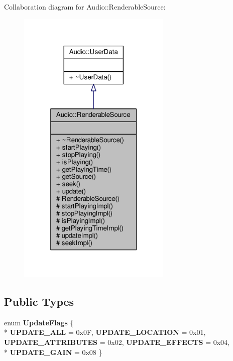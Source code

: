 Collaboration diagram for Audio\+:\+:Renderable\+Source\+:
\nopagebreak
\begin{figure}[H]
\begin{center}
\leavevmode
\includegraphics[width=208pt]{d4/d63/classAudio_1_1RenderableSource__coll__graph}
\end{center}
\end{figure}
\subsection*{Public Types}
\begin{DoxyCompactItemize}
\item 
enum {\bfseries Update\+Flags} \{ \\*
{\bfseries U\+P\+D\+A\+T\+E\+\_\+\+A\+LL} = 0x0F, 
{\bfseries U\+P\+D\+A\+T\+E\+\_\+\+L\+O\+C\+A\+T\+I\+ON} = 0x01, 
{\bfseries U\+P\+D\+A\+T\+E\+\_\+\+A\+T\+T\+R\+I\+B\+U\+T\+ES} = 0x02, 
{\bfseries U\+P\+D\+A\+T\+E\+\_\+\+E\+F\+F\+E\+C\+TS} = 0x04, 
\\*
{\bfseries U\+P\+D\+A\+T\+E\+\_\+\+G\+A\+IN} = 0x08
 \}\hypertarget{classAudio_1_1RenderableSource_a7d694db411ff2640520aa3aa56b0f4d5}{}\label{classAudio_1_1RenderableSource_a7d694db411ff2640520aa3aa56b0f4d5}

\end{DoxyCompactItemize}
